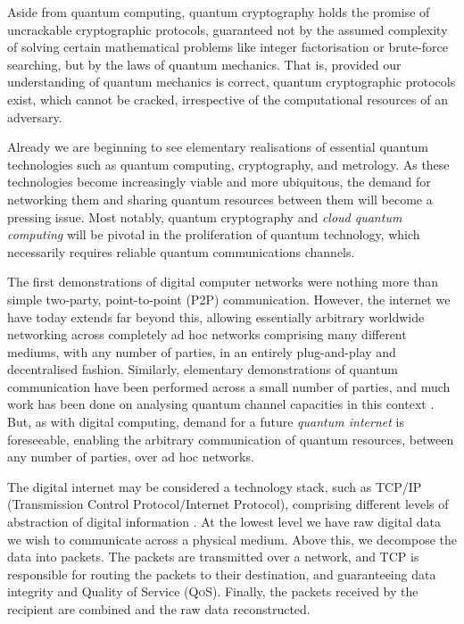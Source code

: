 Aside from quantum computing, quantum cryptography holds the promise of uncrackable cryptographic protocols, guaranteed not by the assumed complexity of solving certain mathematical problems like integer factorisation or brute-force searching, but by the laws of quantum mechanics. That is, provided our understanding of quantum mechanics is correct, quantum cryptographic protocols exist, which cannot be cracked, irrespective of the computational resources of an adversary.

Already we are beginning to see elementary realisations of essential quantum technologies such as quantum computing, cryptography, and metrology. As these technologies become increasingly viable and more ubiquitous, the demand for networking them and sharing quantum resources between them will become a pressing issue. Most notably, quantum cryptography and \textit{cloud quantum computing} will be pivotal in the proliferation of quantum technology, which necessarily requires reliable quantum communications channels.

The first demonstrations of digital computer networks were nothing more than simple two-party, point-to-point (P2P) communication. However, the internet we have today extends far beyond this, allowing essentially arbitrary worldwide networking across completely ad hoc networks comprising many different mediums, with any number of parties, in an entirely plug-and-play and decentralised fashion. Similarly, elementary demonstrations of quantum communication have been performed across a small number of parties, and much work has been done on analysing quantum channel capacities in this context \cite{??? channel_capacity}. But, as with digital computing, demand for a future \textit{quantum internet} is foreseeable, enabling the arbitrary communication of quantum resources, between any number of parties, over ad hoc networks.

The digital internet may be considered a technology stack, such as TCP/IP (Transmission Control Protocol/Internet Protocol), comprising different levels of abstraction of digital information \cite{bib:TanenbaumNet}. At the lowest level we have raw digital data we wish to communicate across a physical medium. Above this, we decompose the data into packets. The packets are transmitted over a network, and TCP is responsible for routing the packets to their destination, and guaranteeing data integrity and Quality of Service (\textsc{QoS}). Finally, the packets received by the recipient are combined and the raw data reconstructed.

